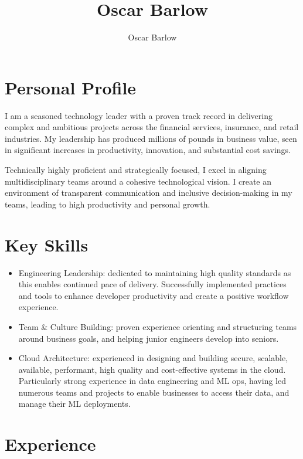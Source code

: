 \documentclass[a4paper]{scrartcl}
\author{Oscar Barlow}
\title{Oscar Barlow}
\date{}
\begin{document}
\maketitle

\section*{Personal Profile}
 { %
  \setlength{\parskip}{6pt plus 2pt minus 1pt}
  I am a seasoned technology leader with a proven track record in
  delivering complex and ambitious projects across the financial services,
  insurance,
  and retail industries. My leadership has produced
  millions of pounds in business value, seen in significant increases in
  productivity, innovation, and substantial cost savings.

  Technically highly proficient and strategically focused, I excel in aligning
  multidisciplinary
  teams around a cohesive technological vision. I create an environment of
  transparent communication and inclusive decision-making in my teams, leading to
  high productivity and personal growth.
 } %

\section*{Key Skills}
\begin{itemize}
	\item Engineering Leadership: dedicated to maintaining high quality standards as this enables continued pace of delivery. Successfully implemented practices and tools to enhance developer productivity and create a positive workflow experience.
	\item Team \& Culture Building: proven experience orienting and structuring teams around business goals, and helping junior engineers develop into seniors.
	\item Cloud Architecture: experienced in designing and building secure,
	      scalable, available, performant, high quality and cost-effective
	      systems in the
	      cloud. Particularly strong experience in data engineering and ML ops, having led numerous teams and projects to enable businesses to access their data, and manage their ML deployments.
\end{itemize}

\section*{Experience}
\end{document}
